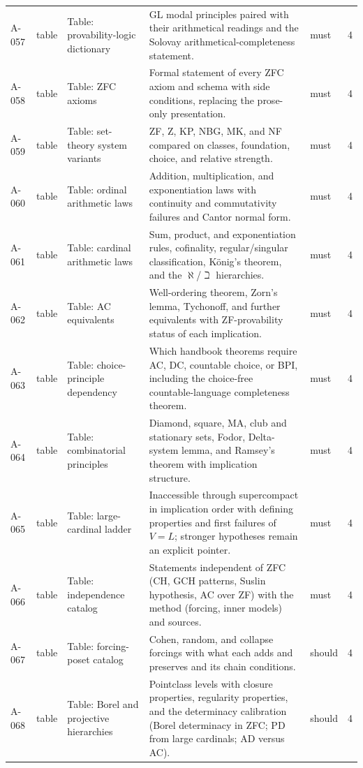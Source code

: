 \begin{longtable}{@{}p{0.45in}p{0.78in}p{2.02in}p{2.6in}p{0.42in}p{0.16in}@{}}
A-057 & table & Table: provability-logic dictionary & GL modal principles paired with their arithmetical readings and the Solovay arithmetical-completeness statement. & must & 4 \\
A-058 & table & Table: ZFC axioms & Formal statement of every ZFC axiom and schema with side conditions, replacing the prose-only presentation. & must & 4 \\
A-059 & table & Table: set-theory system variants & ZF, Z, KP, NBG, MK, and NF compared on classes, foundation, choice, and relative strength. & must & 4 \\
A-060 & table & Table: ordinal arithmetic laws & Addition, multiplication, and exponentiation laws with continuity and commutativity failures and Cantor normal form. & must & 4 \\
A-061 & table & Table: cardinal arithmetic laws & Sum, product, and exponentiation rules, cofinality, regular/singular classification, K\"onig's theorem, and the \(\aleph\)/\(\beth\) hierarchies. & must & 4 \\
A-062 & table & Table: AC equivalents & Well-ordering theorem, Zorn's lemma, Tychonoff, and further equivalents with ZF-provability status of each implication. & must & 4 \\
A-063 & table & Table: choice-principle dependency & Which handbook theorems require AC, DC, countable choice, or BPI, including the choice-free countable-language completeness theorem. & must & 4 \\
A-064 & table & Table: combinatorial principles & Diamond, square, MA, club and stationary sets, Fodor, Delta-system lemma, and Ramsey's theorem with implication structure. & must & 4 \\
A-065 & table & Table: large-cardinal ladder & Inaccessible through supercompact in implication order with defining properties and first failures of \(V=L\); stronger hypotheses remain an explicit pointer. & must & 4 \\
A-066 & table & Table: independence catalog & Statements independent of ZFC (CH, GCH patterns, Suslin hypothesis, AC over ZF) with the method (forcing, inner models) and sources. & must & 4 \\
A-067 & table & Table: forcing-poset catalog & Cohen, random, and collapse forcings with what each adds and preserves and its chain conditions. & should & 4 \\
A-068 & table & Table: Borel and projective hierarchies & Pointclass levels with closure properties, regularity properties, and the determinacy calibration (Borel determinacy in ZFC; PD from large cardinals; AD versus AC). & should & 4 \\

\end{longtable}
